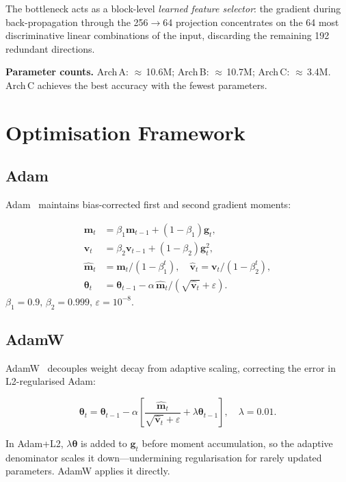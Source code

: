 \documentclass[10pt,conference,letterpaper]{IEEEtran}
\begin{document}
The bottleneck acts as a block-level \emph{learned feature selector}: the
gradient during back-propagation through the 256$\to$64 projection concentrates
on the 64 most discriminative linear combinations of the input, discarding the
remaining 192 redundant directions.

\textbf{Parameter counts.}
Arch\,A: $\approx$\,10.6M; Arch\,B: $\approx$\,10.7M; Arch\,C: $\approx$\,3.4M.
Arch\,C achieves the best accuracy with the fewest parameters.

\section{Optimisation Framework}
\label{sec:train}

\subsection{Adam}

Adam~\cite{kingma2014adam} maintains bias-corrected first and second gradient moments:
\begin{tcolorbox}[eqbox]
\begin{align}
  \bm{m}_t &= \beta_1\bm{m}_{t-1}+(1-\beta_1)\bm{g}_t, \nonumber\\
  \bm{v}_t &= \beta_2\bm{v}_{t-1}+(1-\beta_2)\bm{g}_t^2, \label{eq:adam}\\
  \hat{\bm{m}}_t &= \bm{m}_t/(1-\beta_1^t),\quad
  \hat{\bm{v}}_t = \bm{v}_t/(1-\beta_2^t), \nonumber\\
  \bm{\theta}_t &= \bm{\theta}_{t-1}
    -\alpha\,\hat{\bm{m}}_t/(\sqrt{\hat{\bm{v}}_t}+\varepsilon). \nonumber
\end{align}
$\beta_1{=}0.9,\,\beta_2{=}0.999,\,\varepsilon{=}10^{-8}$.
\end{tcolorbox}

\subsection{AdamW}

AdamW~\cite{loshchilov2019adamw} decouples weight decay from adaptive scaling,
correcting the error in L2-regularised Adam:
\begin{tcolorbox}[eqbox]
\[
  \bm{\theta}_t = \bm{\theta}_{t-1}
    -\alpha\!\left[\frac{\hat{\bm{m}}_t}{\sqrt{\hat{\bm{v}}_t}+\varepsilon}
    +\lambda\bm{\theta}_{t-1}\right],\quad\lambda=0.01.
\]
\end{tcolorbox}
In Adam+L2, $\lambda\bm{\theta}$ is added to $\bm{g}_t$ before moment
accumulation, so the adaptive denominator scales it down---undermining
regularisation for rarely updated parameters. AdamW applies it directly.
\end{document}
